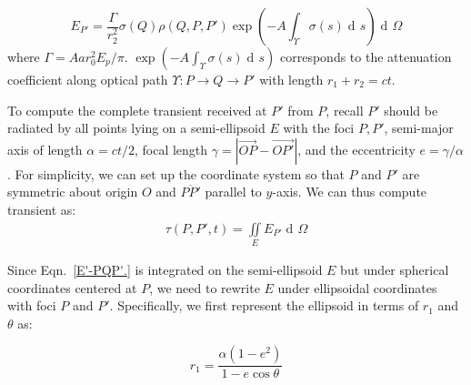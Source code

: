 \documentclass[10pt,journal,compsoc]{IEEEtran}
\DeclareMathOperator{\di}{d\!}
\def\vecx{\boldsymbol{x}}
\begin{document}
\begin{appendices}




\begin{equation}
E_{P'} = \frac{\Gamma}{r_2^{2}} \sigma(Q) \rho(Q,P,P') \exp{\left(-A\int_{\Upsilon}\sigma(s)\di{s}\right)} \di{\Omega}
\label{E'-PQP'.}
\end{equation}
where $\Gamma = Aar_0^2 E_p / \pi$. $\exp{\left(-A\int_{\Upsilon}\sigma(s)\di{s}\right)}$ corresponds to the attenuation coefficient along optical path $\Upsilon:P \to Q \to P'$ with length $r_1 + r_2 = ct$. 

To compute the complete transient received at $P'$ from $P$, recall $P'$ should be radiated by all points lying on a semi-ellipsoid $E$ with the foci $P, P'$, semi-major axis of length $\alpha = ct/2$, focal length $\gamma = |\overrightarrow{OP} - \overrightarrow{OP'}|$, and the eccentricity $e = \gamma / \alpha$. For simplicity, we can set up the coordinate system so that $P$ and $P'$ are symmetric about origin $O$ and $\overline{PP'}$ parallel to $y$-axis. We can thus compute transient as:
\begin{equation}
\begin{aligned}
\tau(P,P',t) = \underset{E}\iint E_{P'} \di{\Omega}
\label{EP'_nonconfocal}
\end{aligned}
\end{equation}

Since Eqn.~\ref{E'-PQP'.} is integrated on the semi-ellipsoid $E$ but under spherical coordinates centered at $P$, we need to rewrite $E$ under ellipsoidal coordinates with foci $P$ and $P'$. Specifically, we first represent the ellipsoid in terms of $r_1$ and $\theta$ as:

\begin{equation}
r_1 = \frac{\alpha(1 - e^{2})}{1 - e \cos{\theta}}
\label{spheroid-sph}
\end{equation}


\end{appendices}
\end{document}

